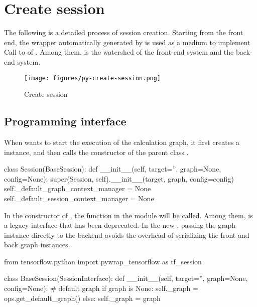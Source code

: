 \section{Create session}
\begin{content}
The following is a detailed process of session creation. Starting from the  front end, the  wrapper automatically generated by  is used as a medium to implement  Call to  of . Among them,  is the watershed of the front-end system and the back-end system.

\begin{figure}[H]
  \centering
  \texttt{[image: figures/py-create-session.png]}
  \caption{Create session}
  \label{fig:py-create-session}
\end{figure}


\subsection{Programming interface}
When  wants to start the execution of the calculation graph, it first creates a  instance, and then calls the constructor of the parent class .

\begin{leftbar}
\begin{python}[caption={tensorflow/python/client/session.py}]
class Session(BaseSession):
  def __init__(self, target='', graph=None, config=None):
    super(Session, self).__init__(target, graph, config=config)
    self._default_graph_context_manager = None
    self._default_session_context_manager = None
\end{python}
\end{leftbar}

In the constructor of , the function in the  module will be called. Among them,  is a legacy interface that has been deprecated. In the new , passing the graph instance directly to the backend  avoids the overhead of serializing the front and back graph instances.

\begin{leftbar}
\begin{python}[caption={tensorflow/python/client/session.py}]
from tensorflow.python import pywrap_tensorflow as tf_session

class BaseSession(SessionInterface):
  def __init__(self, target='', graph=None, config=None):
    # default graph
    if graph is None:
      self._graph = ops.get_default_graph()
    else:
      self._graph = graph


\end{python}
\end{leftbar}
\end{content}
